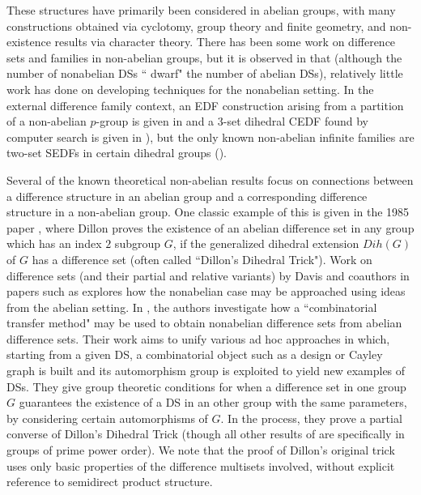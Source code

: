 \documentclass[12pt, a4paper]{article}
\theoremstyle{definition}
\begin{document}
These structures have primarily been considered in abelian groups, with many constructions obtained via cyclotomy, group theory and finite geometry, and non-existence results via character theory.  There has been some work on difference sets and families in non-abelian groups, but it is observed in \cite{Swa} that (although the number of nonabelian DSs `` dwarf" the number of abelian DSs), relatively little work has done on developing techniques for the nonabelian setting.  In the external difference family context, an EDF construction arising from a partition of a non-abelian $p$-group is given  in \cite{HucPatWEDF} and a $3$-set dihedral CEDF found by computer search is given in \cite{HucJefMcC}), but the only known non-abelian infinite families are two-set SEDFs in certain dihedral groups (\cite{HucJefMcC, KrePatSti}).

Several of the known theoretical non-abelian results focus on connections between a difference structure in an abelian group and a corresponding difference structure in a non-abelian group. One classic example of this is given in the 1985 paper \cite{Dil}, where Dillon proves the existence of an abelian difference set in any group which has an index $2$ subgroup $G$, if the generalized dihedral extension $Dih(G)$ of $G$ has a difference set  (often called ``Dillon's Dihedral Trick"). Work on difference sets (and their partial and relative variants) by Davis and coauthors in papers such as \cite{Apple,Dav,Swa} explores how the nonabelian case may be approached using ideas from the abelian setting.  In \cite{Swa}, the authors investigate how a ``combinatorial transfer method" may be used to obtain nonabelian difference sets from abelian difference sets. Their work aims to unify various ad hoc approaches in which, starting from a given DS, a combinatorial object such as a design or Cayley graph is built and its automorphism group is exploited to yield new examples of DSs. They give group theoretic conditions for when a difference set in one group $G$ guarantees the existence of a DS in an other group with the same parameters, by considering certain automorphisms of $G$. In the process, they prove a partial converse of Dillon's Dihedral Trick (though all other results of \cite{Swa} are specifically in groups of prime power order).  We note that the proof of Dillon's original trick uses only basic properties of the difference multisets involved, without explicit reference to semidirect product structure.
\end{document}
